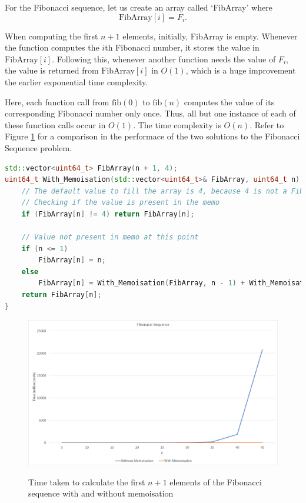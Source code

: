 \documentclass[12pt, a4paper]{article}
\theoremstyle{definition}
\theoremstyle{remark}
\begin{document}
For the Fibonacci sequence, let us create an array called `FibArray' where
\begin{equation*}
    \text{FibArray}[i] = F_i.
\end{equation*}

When computing the first $n+1$ elements, initially, FibArray is empty. Whenever the function computes the $i$th Fibonacci number, it stores the value in $\text{FibArray}[i]$. Following this, whenever another function needs the value of $F_i$, the value is returned from $\text{FibArray}[i]$ in $O(1)$, which is a huge improvement the earlier exponential time complexity.

Here, each function call from $\text{fib}(0)$ to $\text{fib}(n)$ computes the value of its corresponding Fibonacci number only once. Thus, all but one instance of each of these function calls occur in $O(1)$. The time complexity is $O(n)$. Refer to Figure \ref{fig:fibograph} for a comparison in the performace of the two solutions to the Fibonacci Sequence problem.

\begin{lstlisting}[language=C++]
std::vector<uint64_t> FibArray(n + 1, 4);
uint64_t With_Memoisation(std::vector<uint64_t>& FibArray, uint64_t n) {
    // The default value to fill the array is 4, because 4 is not a Fibonacci number
    // Checking if the value is present in the memo
    if (FibArray[n] != 4) return FibArray[n];

    // Value not present in memo at this point
    if (n <= 1)
        FibArray[n] = n;
    else
        FibArray[n] = With_Memoisation(FibArray, n - 1) + With_Memoisation(FibArray, n - 2);
    return FibArray[n];
}
\end{lstlisting}

\begin{figure}[!h]
    \centering
    \includegraphics[scale=0.45]{img/Fibonacci - Memo vs No Memo Graph.png}
    \label{fig:fibograph}
    \caption{Time taken to calculate the first $n+1$ elements of the Fibonacci sequence with and without memoisation}
\end{figure}
\end{document}
